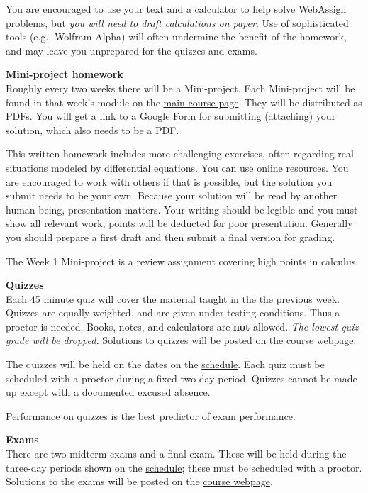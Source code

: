 \documentclass[12pt]{article}
\renewcommand{\emph}[1]{\textsf{\textbf{#1}}}
\newcommand{\localhead}[1]{\par\smallskip\textbf{#1}\nobreak\\}%
\def\subheading#1{\localhead{\emph{#1}}}
\begin{document}
You are encouraged to use your text and a calculator to help solve WebAssign problems, but \textsl{you will need to draft calculations on paper}.  Use of sophisticated tools (e.g., Wolfram Alpha) will often undermine the benefit of the homework, and may leave you unprepared for the quizzes and exams.

\subheading{Mini-project homework}
Roughly every two weeks there will be a Mini-project.  Each Mini-project will be found in that week's module on the \href{https://bueler.github.io/math302/}{main course page}.  They will be distributed as PDFs.  You will get a link to a Google Form for submitting (attaching) your solution, which also needs to be a PDF.

This written homework includes more-challenging exercises, often regarding real situations modeled by differential equations.  You can use online resources.  You are encouraged to work with others if that is possible, but the solution you submit needs to be your own.  Because your solution will be read by another human being, presentation matters.  Your writing should be legible and you must show all relevant work; points will be deducted for poor presentation.  Generally you should prepare a first draft and then submit a final version for grading.

The Week 1 Mini-project is a review assignment covering high points in calculus.

\subheading{Quizzes}
Each 45 minute quiz will cover the material taught in the the previous week.  Quizzes are equally weighted, and are given under testing conditions.  Thus a proctor is needed.  Books, notes, and calculators are \emph{not} allowed.  \textsl{The lowest quiz grade will be dropped.}  Solutions to quizzes will be posted on the \href{https://bueler.github.io/math302/}{course webpage}.

The quizzes will be held on the dates on the \href{https://bueler.github.io/math302/schedule.pdf}{schedule}.  Each quiz must be scheduled with a proctor during a fixed two-day period.  Quizzes cannot be made up except with a documented excused absence.

Performance on quizzes is the best predictor of exam performance.

\subheading{Exams}
There are two midterm exams and a final exam.  These will be held during the three-day periods shown on the \href{https://bueler.github.io/math302/schedule.pdf}{schedule}; these must be scheduled with a proctor.  Solutions to the exams will be posted on the \href{https://bueler.github.io/math302/}{course webpage}.
\end{document}
